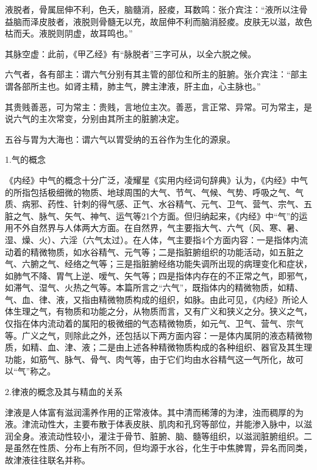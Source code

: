 \documentclass[12pt]{ctexbook}
\begin{document}
\begin{jiaozhu}
  \item 液脱者，骨属屈伸不利，色夭，脑髓消，胫痠，耳数鸣：张介宾注：“液所以注骨益脑而泽皮肢者，液脱则骨髓无以充，故屈伸不利而脑消胫痠。皮肤无以滋，故色枯而夭。液脱则阴虚，故耳鸣也。”
  \item 其脉空虚：此前，《甲乙经》有“脉脱者”三字可从，以全六脱之候。
  \item 六气者，各有部主：谓六气分别有其主管的部位和所主的脏腑。张介宾注：“部主谓各部所主也。如肾主精，肺主气，脾主津液，肝主血，心主脉也。”
  \item 其贵贱善恶，可为常主：贵贱，言地位主次。善恶，言正常、异常。可为常主，是说六气的主次常变，分别由其所主的脏腑决定。
  \item 五谷与胃为大海也：谓六气以胃受纳的五谷作为生化的源泉。
\end{jiaozhu}


1.气的概念

《内经》中气的概念十分广泛，凌耀星《实用内经词句辞典》认为，《内经》中气的所指包括极细微的物质、地球周围的大气、节气、气候、气势、呼吸之气、气质、病邪、药性、针刺的得气感、正气、水谷精气、元气、卫气、营气、宗气、五脏之气、脉气、矢气、神气、运气等21个方面。但归纳起来，《内经》中“气”的运用不外自然界与人体两大方面。在自然界，气主要指大气、六气（风、寒、暑、湿、燥、火）、六淫（六气太过）。在人体，气主要指4个方面内容：一是指体内流动着的精微物质，如水谷精气、元气等；二是指脏腑组织的功能活动，如五脏之气、六腑之气、经络之气等；三是指脏腑经络功能失调所出现的病理变化和症状，如肺气不降、胃气上逆、嗳气、矢气等；四是指体内存在的不正常之气，即邪气，如滞气、湿气、火热之气等。本篇所言之“六气”，既指体内的精微物质，如精、气、血、律、液，又指由精微物质构成的组织，如脉。由此可见，《内经》所论人体生理之气，有物质和功能之分，从物质而言，又有广义和狭义之分。狭义之气，仅指在体内流动着的属阳的极微细的气态精微物质，如元气、卫气、营气、宗气等。广义之气，则除此之外，还包括以下两方面内容：一是体内属阴的液态精微物质，如精、血、津、液；二是由上述各种精微物质构成的各种组织、器官及其生理功能，如筋气、脉气、骨气、肉气等，由于它们均由水谷精气这一气所化，故可以“气”称之。

2.律液的概念及其与精血的关系

津液是人体富有滋润濡养作用的正常液体。其中清而稀薄的为津，浊而稠厚的为液。津流动性大，主要布散于体表皮肤、肌肉和孔窍等部位，并能渗入脉中，以滋润全身。液流动性较小，灌注于骨节、脏腑、脑、髓等组织，以滋润脏腑组织。二是虽然在性质、分布上有所不同，但均源于水谷，化生于中焦脾胃，异名而同类，故津液往往联名并称。
\end{document}
